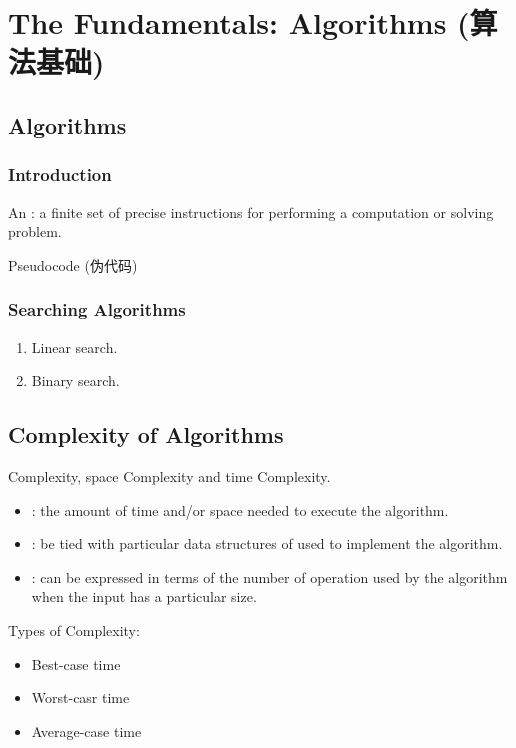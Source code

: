 \section[The Fundamentals: Algorithms]{The Fundamentals: Algorithms (算法基础)}
\subsection{Algorithms}

\subsubsection{Introduction}

\begin{definition}
    An : a finite set of precise instructions for performing a computation or solving problem. 
\end{definition}

Pseudocode (伪代码)

\subsubsection{Searching Algorithms}
\begin{enumerate}
    \item Linear search. 
    \item Binary search. 
\end{enumerate}

\subsection{Complexity of Algorithms}
\begin{definition}
    Complexity, space Complexity and time Complexity. 
    \begin{itemize}
        \item {}: the amount of time and/or space needed to execute the algorithm. 
        \item {}: be tied with particular data structures of used to implement the algorithm. 
        \item {}: can be expressed in terms of the number of operation used by the algorithm when the input has a particular size. 
    \end{itemize}
\end{definition}

Types of Complexity: 
\begin{itemize}
    \item Best-case time
    \item Worst-casr time
    \item Average-case time 
\end{itemize}

